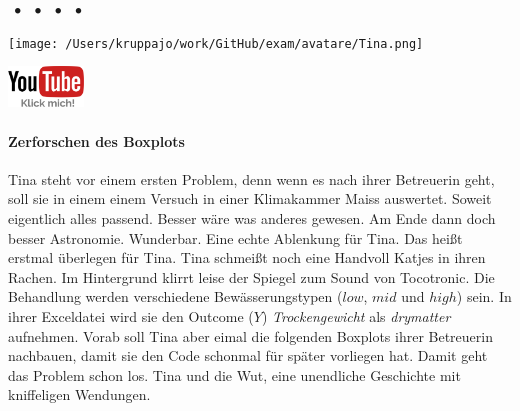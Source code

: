 \documentclass[a4paper, 9pt]{scrartcl}\usepackage[]{graphicx}\usepackage[]{xcolor}
\begin{document}
 
\ifcollection
\begin{flushright}
\tiny\vspace{-3Ex}
\textbf{\examinhaltstart}
\exammodulemathstat $\;\bullet$
\exammodulestat $\;\bullet$
\exammodulestatbbv $\;\bullet$
\exammodulestatversuch $\;\bullet$
\exammodulebiostat
\vspace{-4Ex}
\end{flushright}
\begin{minipage}[t]{0.5\textwidth}
\texttt{[image: /Users/kruppajo/work/GitHub/exam/avatare/Tina.png]}
\end{minipage}
\begin{minipage}[t]{0.5\textwidth}
\hfill
\href{https://youtu.be/Xf0yE-o7bEU}{\includegraphics[width = 2cm]{img/youtube}}
\end{minipage}
\vspace{-3ex}
\fi



\ifcollection
\paragraph{Zerforschen des Boxplots}
\fi

Tina steht vor einem ersten Problem, denn wenn es nach ihrer Betreuerin geht, soll sie in einem einem Versuch in einer Klimakammer Maiss auswertet. Soweit eigentlich alles passend. Besser wäre was anderes gewesen. Am Ende dann doch besser Astronomie. Wunderbar. Eine echte Ablenkung für Tina. Das heißt erstmal überlegen für Tina. Tina schmeißt noch eine Handvoll Katjes in ihren Rachen. Im Hintergrund klirrt leise der Spiegel zum Sound von Tocotronic. Die Behandlung werden verschiedene Bewässerungstypen ($low$, $mid$ und $high$) sein. In ihrer Exceldatei wird sie den Outcome ($Y$) \textit{Trockengewicht} als \textit{drymatter} aufnehmen. Vorab soll Tina aber eimal die folgenden Boxplots ihrer Betreuerin nachbauen, damit sie den \Rlogo Code schonmal für später vorliegen hat. Damit geht das Problem schon los. Tina und die Wut, eine unendliche Geschichte mit kniffeligen Wendungen.
\end{document}
